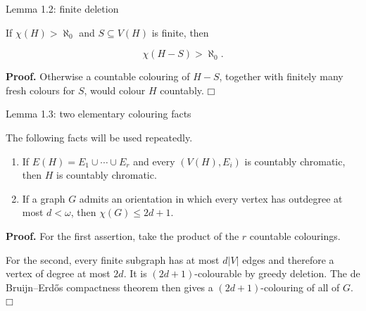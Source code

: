 \documentclass[11pt]{article}
\newcommand{\tightlist}{\setlength{\itemsep}{0pt}\setlength{\parskip}{0pt}}
\providecommand{\square}{\mdlgwhtsquare}
\begin{document}
\label{lemma-1.2-finite-deletion}
\begin{lemmabox}{Lemma 1.2: finite deletion}

If \(\chi(H)>\aleph_0\) and \(S\subseteq V(H)\) is finite, then

\[
\chi(H-S)>\aleph_0.
\]

\end{lemmabox}
\textbf{Proof.} Otherwise a countable colouring of \(H-S\), together with finitely many fresh colours for \(S\), would colour \(H\) countably. \(\square\)

\label{lemma-1.3-two-elementary-colouring-facts}
\begin{lemmabox}{Lemma 1.3: two elementary colouring facts}

The following facts will be used repeatedly.

\begin{enumerate}
\def\labelenumi{\arabic{enumi}.}
\tightlist
\item
  If \(E(H)=E_1\cup\cdots\cup E_r\) and every \((V(H),E_i)\) is countably chromatic, then \(H\) is countably chromatic.
\item
  If a graph \(G\) admits an orientation in which every vertex has outdegree at most \(d<\omega\), then \(\chi(G)\le 2d+1\).
\end{enumerate}

\end{lemmabox}
\textbf{Proof.} For the first assertion, take the product of the \(r\) countable colourings.

For the second, every finite subgraph has at most \(d|V|\) edges and therefore a vertex of degree at most \(2d\). It is \((2d+1)\)-colourable by greedy deletion. The de Bruijn--Erdős compactness theorem then gives a \((2d+1)\)-colouring of all of \(G\). \(\square\)
\end{document}
